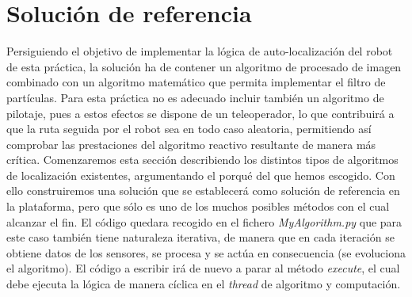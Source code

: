 \section{Solución de referencia}
Persiguiendo el objetivo de implementar la lógica de auto-localización del robot de esta práctica, la solución ha de contener un algoritmo de procesado de imagen combinado con un algoritmo matemático que permita implementar el filtro de partículas. Para esta práctica no es adecuado incluir también un algoritmo de pilotaje, pues a estos efectos se dispone de un teleoperador, lo que contribuirá a que la ruta seguida por el robot sea en todo caso aleatoria, permitiendo así comprobar las prestaciones del algoritmo reactivo resultante de manera más crítica. 
Comenzaremos esta sección describiendo los distintos tipos de algoritmos de localización existentes, argumentando el porqué del que hemos escogido. Con ello construiremos una solución que se establecerá como solución de referencia en la plataforma, pero que sólo es uno de los muchos posibles métodos con el cual alcanzar el fin. El código quedara recogido en el fichero \textit{MyAlgorithm.py} que para este caso también tiene naturaleza iterativa, de manera que en cada iteración se obtiene datos de los sensores, se procesa y se actúa en consecuencia (se evoluciona el algoritmo). El código a escribir irá de nuevo a parar al método \textit{execute}, el cual debe ejecuta la lógica de manera cíclica en el \textit{thread} de algoritmo y computación.

